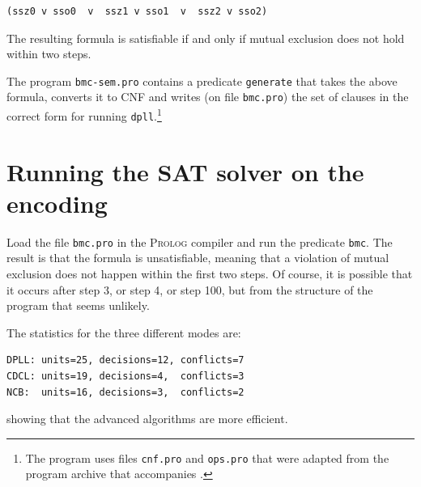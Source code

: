 \documentclass[11pt]{report}
\newcommand*{\p}[1]{\textup{\texttt{#1}}}
\newcommand*{\pl}{\textsc{Prolog}}
\begin{document}
\begin{verbatim}
(ssz0 v sso0  v  ssz1 v sso1  v  ssz2 v sso2)
\end{verbatim}

The resulting formula is satisfiable if and only if mutual exclusion
does not hold within two steps.

The program \p{bmc-sem.pro} contains a predicate \p{generate} that takes
the above formula, converts it to CNF and writes (on file \p{bmc.pro})
the set of clauses in the correct form for running
\p{dpll}.\footnote{The program uses files \p{cnf.pro} and \p{ops.pro}
that were adapted from the program archive that accompanies
\cite{mlcs}.}

\section{Running the SAT solver on the encoding}

Load the file \p{bmc.pro} in the \pl{} compiler and run the predicate
\p{bmc}. The result is that the formula is unsatisfiable, meaning that a
violation of mutual exclusion does not happen within the first two
steps. Of course, it is possible that it occurs after step 3, or step 4,
or step 100, but from the structure of the program that seems unlikely.

The statistics for the three different modes are:
\begin{verbatim}
DPLL: units=25, decisions=12, conflicts=7
CDCL: units=19, decisions=4,  conflicts=3
NCB:  units=16, decisions=3,  conflicts=2
\end{verbatim}
showing that the advanced algorithms are more efficient.
\end{document}
